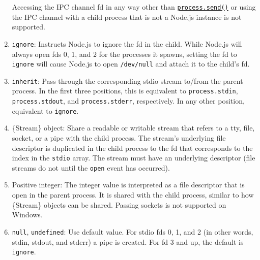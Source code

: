 \begin{enumerate}
  Accessing the IPC channel fd in any way other than
  \href{process.md\#processsendmessage-sendhandle-options-callback}{\texttt{process.send()}}
  or using the IPC channel with a child process that is not a Node.js
  instance is not supported.
\item
  \texttt{\textquotesingle{}ignore\textquotesingle{}}: Instructs Node.js
  to ignore the fd in the child. While Node.js will always open fds 0,
  1, and 2 for the processes it spawns, setting the fd to
  \texttt{\textquotesingle{}ignore\textquotesingle{}} will cause Node.js
  to open \texttt{/dev/null} and attach it to the child's fd.
\item
  \texttt{\textquotesingle{}inherit\textquotesingle{}}: Pass through the
  corresponding stdio stream to/from the parent process. In the first
  three positions, this is equivalent to \texttt{process.stdin},
  \texttt{process.stdout}, and \texttt{process.stderr}, respectively. In
  any other position, equivalent to
  \texttt{\textquotesingle{}ignore\textquotesingle{}}.
\item
  \{Stream\} object: Share a readable or writable stream that refers to
  a tty, file, socket, or a pipe with the child process. The stream's
  underlying file descriptor is duplicated in the child process to the
  fd that corresponds to the index in the \texttt{stdio} array. The
  stream must have an underlying descriptor (file streams do not until
  the \texttt{\textquotesingle{}open\textquotesingle{}} event has
  occurred).
\item
  Positive integer: The integer value is interpreted as a file
  descriptor that is open in the parent process. It is shared with the
  child process, similar to how \{Stream\} objects can be shared.
  Passing sockets is not supported on Windows.
\item
  \texttt{null}, \texttt{undefined}: Use default value. For stdio fds 0,
  1, and 2 (in other words, stdin, stdout, and stderr) a pipe is
  created. For fd 3 and up, the default is
  \texttt{\textquotesingle{}ignore\textquotesingle{}}.
\end{enumerate}

